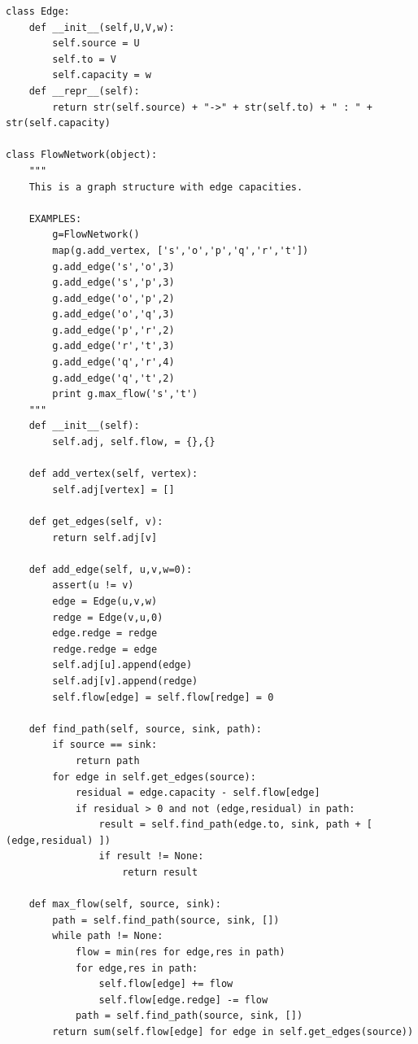 \begin{lstlisting}
class Edge:
    def __init__(self,U,V,w):
        self.source = U
        self.to = V
        self.capacity = w
    def __repr__(self):
        return str(self.source) + "->" + str(self.to) + " : " + str(self.capacity)

class FlowNetwork(object):
    """
    This is a graph structure with edge capacities.

    EXAMPLES:
        g=FlowNetwork()
        map(g.add_vertex, ['s','o','p','q','r','t'])
        g.add_edge('s','o',3)
        g.add_edge('s','p',3)
        g.add_edge('o','p',2)
        g.add_edge('o','q',3)
        g.add_edge('p','r',2)
        g.add_edge('r','t',3)
        g.add_edge('q','r',4)
        g.add_edge('q','t',2)
        print g.max_flow('s','t')
    """
    def __init__(self):
        self.adj, self.flow, = {},{}

    def add_vertex(self, vertex):
        self.adj[vertex] = []

    def get_edges(self, v):
        return self.adj[v]

    def add_edge(self, u,v,w=0):
        assert(u != v)
        edge = Edge(u,v,w)
        redge = Edge(v,u,0)
        edge.redge = redge
        redge.redge = edge
        self.adj[u].append(edge)
        self.adj[v].append(redge)
        self.flow[edge] = self.flow[redge] = 0

    def find_path(self, source, sink, path):
        if source == sink:
            return path
        for edge in self.get_edges(source):
            residual = edge.capacity - self.flow[edge]
            if residual > 0 and not (edge,residual) in path:
                result = self.find_path(edge.to, sink, path + [ (edge,residual) ])
                if result != None:
                    return result

    def max_flow(self, source, sink):
        path = self.find_path(source, sink, [])
        while path != None:
            flow = min(res for edge,res in path)
            for edge,res in path:
                self.flow[edge] += flow
                self.flow[edge.redge] -= flow
            path = self.find_path(source, sink, [])
        return sum(self.flow[edge] for edge in self.get_edges(source))
\end{lstlisting}


